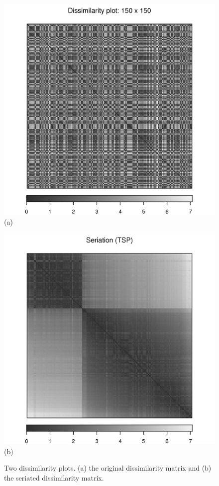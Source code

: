 \documentclass[fleqn, a4paper]{article}
\begin{document}
\begin{figure}
    \begin{minipage}[b]{.48\linewidth}
    \centering
    \includegraphics[width=\linewidth]{seriation-dissplot1} \\
    (a)    
    \end{minipage}
    \begin{minipage}[b]{.48\linewidth}
    \centering
    \includegraphics[width=\linewidth]{seriation-dissplot2} \\
    (b)   
    \end{minipage}
    \caption{Two dissimilarity plots. 
    (a) the original dissimilarity matrix and 
    (b) the seriated dissimilarity matrix.}
    \label{fig:dissplot1}
\end{figure}
\end{document}
